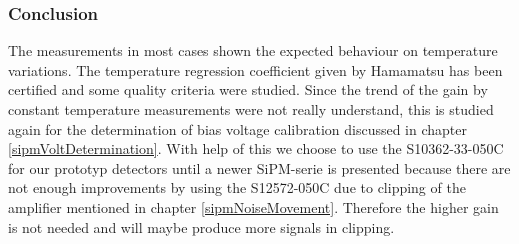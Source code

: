 \subsubsection{Conclusion}
The measurements in most cases shown the expected behaviour on temperature variations. The temperature regression coefficient given by Hamamatsu has been certified and some quality criteria were studied. Since the trend of the gain by constant temperature measurements were not really understand, this is studied again for the determination of bias voltage calibration discussed in chapter \ref{sipmVoltDetermination}. 
With help of this we choose to use the S10362-33-050C for our prototyp detectors until a newer SiPM-serie is presented because there are not enough improvements by using the S12572-050C due to clipping of the amplifier mentioned in chapter \ref{sipmNoiseMovement}. Therefore the higher gain is not needed and will maybe produce more signals in clipping. 
